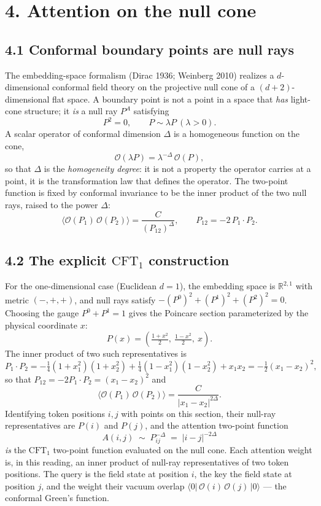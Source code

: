 \section{4. Attention on the null
cone}\label{attention-on-the-null-cone}

\subsection{4.1 Conformal boundary points are null
rays}\label{conformal-boundary-points-are-null-rays}

The embedding-space formalism (Dirac 1936; Weinberg 2010) realizes a
\(d\)-dimensional conformal field theory on the projective null cone of
a \((d+2)\)-dimensional flat space. A boundary point is not a point in a
space that \emph{has} light-cone structure; it \emph{is} a null ray
\(P^A\) satisfying \[
P^2 = 0, \qquad P \sim \lambda P \ (\lambda > 0).
\] A scalar operator of conformal dimension \(\Delta\) is a homogeneous
function on the cone, \[
\mathcal{O}(\lambda P) = \lambda^{-\Delta}\,\mathcal{O}(P),
\] so that \(\Delta\) is the \emph{homogeneity degree}: it is not a
property the operator carries at a point, it is the transformation law
that defines the operator. The two-point function is fixed by conformal
invariance to be the inner product of the two null rays, raised to the
power \(\Delta\): \[
\langle \mathcal{O}(P_1)\,\mathcal{O}(P_2)\rangle
= \frac{C}{(P_{12})^{\Delta}}, \qquad P_{12} = -2\,P_1\!\cdot\!P_2.
\]

\subsection{\texorpdfstring{4.2 The explicit \(\mathrm{CFT}_1\)
construction}{4.2 The explicit \textbackslash mathrm\{CFT\}\_1 construction}}\label{the-explicit-mathrmcft_1-construction}

For the one-dimensional case (Euclidean \(d=1\)), the embedding space is
\(\mathbb{R}^{2,1}\) with metric \((-,+,+)\), and null rays satisfy
\(-(P^0)^2 + (P^1)^2 + (P^2)^2 = 0\). Choosing the gauge
\(P^0 + P^1 = 1\) gives the Poincar\textquotesingle e section
parameterized by the physical coordinate \(x\): \[
\boxed{\,P(x) = \left(\tfrac{1+x^2}{2},\ \tfrac{1-x^2}{2},\ x\right).\,}
\] The inner product of two such representatives is \[
P_1\!\cdot\!P_2
= -\tfrac{1}{4}(1+x_1^2)(1+x_2^2)
  + \tfrac{1}{4}(1-x_1^2)(1-x_2^2)
  + x_1 x_2
= -\tfrac{1}{2}(x_1 - x_2)^2,
\] so that \(P_{12} = -2P_1\!\cdot\!P_2 = (x_1 - x_2)^2\) and \[
\langle \mathcal{O}(P_1)\,\mathcal{O}(P_2)\rangle
= \frac{C}{|x_1 - x_2|^{2\Delta}}.
\] Identifying token positions \(i, j\) with points on this section,
their null-ray representatives are \(P(i)\) and \(P(j)\), and the
attention two-point function \[
A(i,j) \;\sim\; P_{ij}^{-\Delta} \;=\; |i-j|^{-2\Delta}
\] \emph{is} the \(\mathrm{CFT}_1\) two-point function evaluated on the
null cone. Each attention weight is, in this reading, an inner product
of null-ray representatives of two token positions. The query is the
field state at position \(i\), the key the field state at position
\(j\), and the weight their vacuum overlap
\(\langle 0|\,\mathcal{O}(i)\,\mathcal{O}(j)\,|0\rangle\) --- the
conformal Green's function.

